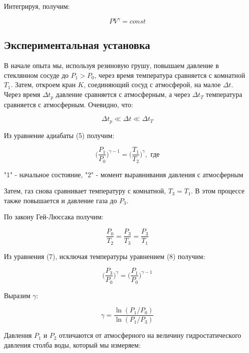\documentclass[a4paper]{article}
\begin{document}
Интегрируя, получим:

\begin{equation}
    PV^\gamma = const
\end{equation}

\subsection*{Экспериментальная установка}

В начале опыта мы, используя резиновую грушу, повышаем давление
в стеклянном сосуде до $P_1 > P_0$, через время температура сравняется с комнатной $T_1$.
Затем, откроем кран $K$, соединяющий сосуд с атмосферой, на малое $\Delta t$.
Через время $\Delta t_p$ давление сравняется с атмосферным,
а через $\Delta t_T$ температура сравняется с атмосферным. Очевидно, что:

\begin{equation}
    \Delta t_p \ll \Delta t \ll \Delta t_T
\end{equation}

Из уравнение адиабаты (5) получим:

\begin{equation}
    \biggl(\frac{P_1}{P_0}\biggl)^{\gamma-1} = \biggl(\frac{T_1}{T_2}\biggl)^\gamma, \text{ где}
\end{equation}

"1" - начальное состояние, 
"2" - момент выравнивания давления с атмосферным

Затем, газ снова сравнивает температуру с комнатной, $T_3 = T_1$.
В этом процессе также повышается и давление газа до $P_3$.

По закону Гей-Люссака получим:

\begin{equation}
    \frac{P_0}{T_2} = \frac{P_3}{T_3} = \frac{P_3}{T_1}
\end{equation}

Из уравнения (7), исключая температуры уравнением (8) получим:

\begin{equation*}
    \biggl(\frac{P_3}{P_0}\biggl)^{\gamma} = \biggl(\frac{P_1}{P_0}\biggl)^{\gamma - 1}
\end{equation*}

Выразим $\gamma$:

\begin{equation}
    \gamma = \frac{\ln(P_1/P_0)}{\ln(P_1/P_3)}
\end{equation}

Давления $P_1$ и $P_2$ отличаются от атмосферного
на величину гидростатического давления столба воды, который мы измеряем: 
\end{document}
